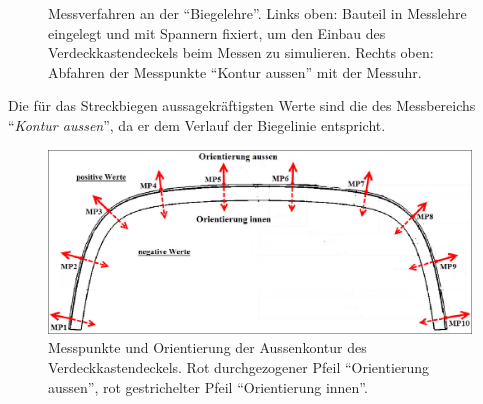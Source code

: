 \documentclass[12pt,a4paper,parskip,twoside,BCOR5mm,headsepline]{scrartcl}
\begin{document}
\begin{figure}[hbtp]
\centering
\hfill
{}
\hfill
{}
\hfill
\caption{Messverfahren an der "`Biegelehre"'. Links oben: Bauteil in Messlehre eingelegt und mit  Spannern fixiert,  um den Einbau des Verdeckkastendeckels beim Messen zu simulieren. Rechts oben: Abfahren der Messpunkte "`Kontur aussen"' mit der Messuhr. }
\label{fig:messverfahren}
\end{figure}


Die für das Streckbiegen aussagekräftigsten Werte sind die des  Messbereichs "`\emph{Kontur aussen}"',  da er dem Verlauf der Biegelinie entspricht.\\
\begin{figure}[hbtp]
\centering
\includegraphics[width=.8\textwidth]{vdkdorient}
\caption{Messpunkte und Orientierung der Aussenkontur des Verdeckkastendeckels. Rot durchgezogener Pfeil "`Orientierung aussen"', rot gestrichelter Pfeil "`Orientierung innen"'.}
\label{fig:messpunktorientierung}
\end{figure}
\end{document}
